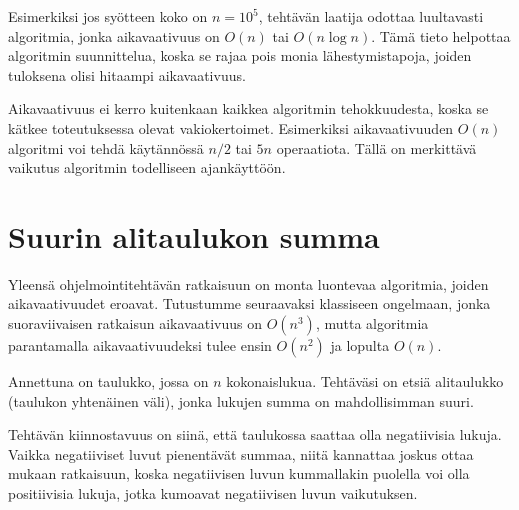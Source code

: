 Esimerkiksi jos syötteen koko on $n=10^5$,
tehtävän laatija odottaa luultavasti
algoritmia, jonka aikavaativuus on $O(n)$ tai $O(n \log n)$.
Tämä tieto helpottaa algoritmin suunnittelua,
koska se rajaa pois monia lähestymistapoja,
joiden tuloksena olisi hitaampi aikavaativuus.

Aikavaativuus ei kerro kuitenkaan kaikkea algoritmin
tehokkuudesta, koska se kätkee toteutuksessa olevat
vakiokertoimet. Esimerkiksi aikavaativuuden $O(n)$
algoritmi voi tehdä käytännössä $n/2$ tai $5n$ operaatiota.
Tällä on merkittävä vaikutus algoritmin
todelliseen ajankäyttöön.

\section{Suurin alitaulukon summa}


Yleensä ohjelmointitehtävän ratkaisuun on monta
luontevaa algoritmia, joiden aikavaativuudet eroavat.
Tutustumme seuraavaksi klassiseen ongelmaan,
jonka suoraviivaisen ratkaisun aikavaativuus on $O(n^3)$,
mutta algoritmia parantamalla aikavaativuudeksi
tulee ensin $O(n^2)$ ja lopulta $O(n)$.

\begin{task}
Annettuna on taulukko, jossa on $n$ kokonaislukua.
Tehtäväsi on etsiä alitaulukko (taulukon yhtenäinen väli),
jonka lukujen summa on mahdollisimman suuri.
\end{task}

Tehtävän kiinnostavuus on siinä, että taulukossa
saattaa olla negatiivisia lukuja.
Vaikka negatiiviset luvut pienentävät summaa,
niitä kannattaa joskus ottaa mukaan ratkaisuun,
koska negatiivisen luvun kummallakin puolella voi
olla positiivisia lukuja, jotka kumoavat negatiivisen
luvun vaikutuksen.

